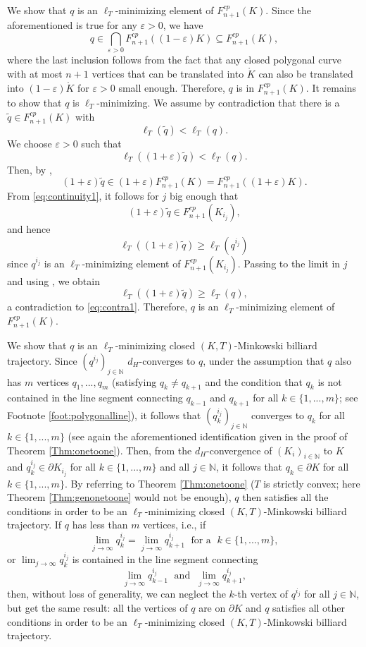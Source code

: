 \documentclass[12pt]{amsart}
\theoremstyle{plain}
\theoremstyle{remark}
\theoremstyle{definition}
\def\eps{\varepsilon}
\newcommand{\N}{\mathbb{N}}
\def\beq{\begin{equation}}\def\eeq{\end{equation}}
\def\beqq{\begin{equation*}}\def\eeqq{\end{equation*}}
\begin{document}
We show that $q$ is an $\ell_{T}$-minimizing element of $F_{n+1}^{cp}(K)$. Since the aforementioned is true for any $\eps >0$, we have
\beqq q\in \bigcap_{\eps >0} F_{n+1}^{cp}((1-\eps)K)\subseteq F_{n+1}^{cp}(K),\eeqq
where the last inclusion follows from the fact that any closed polygonal curve with at most $n+1$ vertices that can be translated into $\mathring{K}$ can also be translated into $(1-\eps)\mathring{K}$ for $\eps >0$ small enough. Therefore, $q$ is in $F_{n+1}^{cp}(K)$. It remains to show that $q$ is $\ell_{T}$-minimizing. We assume by contradiction that there is a $\widetilde{q}\in F_{n+1}^{cp}(K)$ with
\beqq \ell_{T}(\widetilde{q})<\ell_{T}(q).\eeqq
We choose $\eps >0$ such that
\beq \ell_{T}((1+\eps)\widetilde{q})<\ell_{T}(q).\label{eq:contra1}\eeq
Then, by \cite[Proposition 3.11(ii)]{KruppRudolf2022},
\beqq (1+\eps)\widetilde{q} \in (1+\eps)F_{n+1}^{cp}(K)=F_{n+1}^{cp}((1+\eps)K).\eeqq
From \eqref{eq:continuity1}, it follows for $j$ big enough that
\beqq (1+\eps)\widetilde{q}\in F_{n+1}^{cp}(K_{i_j}),\eeqq
and hence
\beqq\ell_{T}((1+\eps)\widetilde{q})\geq \ell_{T}(q^{i_j})\eeqq
since $q^{i_j}$ is an $\ell_T$-minimizing element of $F_{n+1}^{cp}(K_{i_j})$. Passing to the limit in $j$ and using \cite[Proposition 3.11(v)]{KruppRudolf2022}, we obtain
\beqq \ell_{T}((1+\eps)\widetilde{q})\geq \ell_{T}(q),\eeqq
a contradiction to \eqref{eq:contra1}. Therefore, $q$ is an $\ell_{T}$-minimizing element of $F_{n+1}^{cp}(K)$.

We show that $q$ is an $\ell_T$-minimizing closed $(K,T)$-Minkowski billiard trajectory. Since $(q^{i_j})_{j\in\N}$ $d_H$-converges to $q$, under the assumption that $q$ also has $m$ vertices $q_1,...,q_m$ (satisfying $q_k\neq q_{k+1}$ and the condition that $q_k$ is not contained in the line segment connecting $q_{k-1}$ and $q_{k+1}$ for all $k\in\{1,...,m\}$; see Footnote \ref{foot:polygonalline}), it follows that $(q_k^{i_j})_{j\in\N}$ converges to $q_k$ for all $k\in \{1,...,m\}$ (see again the aforementioned identification given in the proof of Theorem \ref{Thm:onetoone}). Then, from the $d_H$-convergence of $(K_i)_{i\in\N}$ to $K$ and $q_k^{i_j}\in\partial K_{i_j}$ for all $k\in\{1,...,m\}$ and all $j\in\N$, it follows that $q_k\in\partial K$ for all $k\in\{1,...,m\}$. By referring to Theorem \ref{Thm:onetoone} ($T$ is strictly convex; here Theorem \ref{Thm:genonetoone} would not be enough), $q$ then satisfies all the conditions in order to be an $\ell_T$-minimizing closed $(K,T)$-Minkowski billiard trajectory. If $q$ has less than $m$ vertices, i.e., if
\beqq \lim_{j\rightarrow\infty} q_k^{i_j} = \lim_{j\rightarrow \infty} q_{k+1}^{i_j} \; \text{ for a } \; k\in\{1,...,m\},\eeqq
or $\lim_{j\rightarrow\infty} q_k^{i_j}$ is contained in the line segment connecting
\beqq \lim_{j\rightarrow\infty} q_{k-1}^{i_j}\; \text{ and }\; \lim_{j\rightarrow\infty} q_{k+1}^{i_j},\eeqq
then, without loss of generality, we can neglect the $k$-th vertex of $q^{i_j}$ for all $j\in\N$, but get the same result: all the vertices of $q$ are on $\partial K$ and $q$ satisfies all other conditions in order to be an $\ell_T$-minimizing closed $(K,T)$-Minkowski billiard trajectory.
\end{document}
